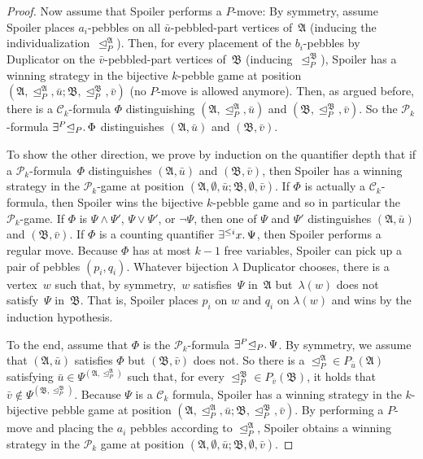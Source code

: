 \documentclass[]{lmcs}
\newcommand{\qspace}{\mathchoice{\;}{\,}{}{}}
\newcommand{\formA}{\Phi}
\newcommand{\formB}{\Psi}
\newcommand{\tup}[1]{\bar{#1}}
\newcommand{\vertA}{u}
\newcommand{\vertB}{v}
\newcommand{\vertC}{w}
\newcommand{\StructA}{\mathfrak{A}}
\newcommand{\StructB}{\mathfrak{B}}
\newcommand{\Ck}[1]{\mathcal{C}_{#1}}
\newcommand{\gamebij}{\lambda}
\newcommand{\indRel}{\trianglelefteq}
\newcommand{\Pk}[1]{\mathcal{P}_{#1}}
\newcommand{\existsP}[1]{\exists^P{#1}}
\newcommand{\partind}[2]{P_{#2}(#1)}
\begin{document}
\begin{proof}
	Now assume that Spoiler performs a $P$-move:
	By symmetry, assume Spoiler places $a_i$\nobreakdash-pebbles on all $\tup{\vertA}$\nobreakdash-pebbled-part vertices of~$\StructA$ (inducing the individualization~$\indRel_P^\StructA$).
	Then, for every placement of the $b_i$\nobreakdash-pebbles by Duplicator on the $\tup{\vertB}$\nobreakdash-pebbled-part vertices of~$\StructB$
	(inducing~$\indRel_P^\StructB$),
	Spoiler has a winning strategy in the bijective $k$-pebble game at position
	$(\StructA, \indRel_P^\StructA, \tup{\vertA}; \StructB, \indRel_P^\StructB, \tup{\vertB})$ (no $P$-move is allowed anymore).
	Then, as argued before, there is a $\Ck{k}$\nobreakdash-formula $\formA$
	distinguishing $(\StructA, \indRel_P^\StructA, \tup{\vertA})$ and $(\StructB, \indRel_P^\StructB, \tup{\vertB})$.
	So the $\Pk{k}$-formula
	$\existsP{\indRel_P}.\qspace \formA$
	distinguishes $(\StructA, \tup{\vertA})$ and $(\StructB, \tup{\vertB})$.
	
	To show the other direction,
	we prove by induction on the quantifier depth that if
	a $\Pk{k}$\nobreakdash-formula~$\formA$ distinguishes $(\StructA, \tup{\vertA})$ and $(\StructB, \tup{\vertB})$,
	then Spoiler has a winning strategy in the $\Pk{k}$-game at position $(\StructA, \emptyset,\tup{\vertA}; \StructB, \emptyset, \tup{\vertB})$.
	If $\formA$ is actually a $\Ck{k}$-formula, then Spoiler wins the bijective $k$-pebble game and so in particular the $\Pk{k}$-game.
	If $\formA$ is $\formB \land \formB'$, $\formB \lor \formB'$, or $\neg \formB$, then one of $\formB$ and $\formB'$ distinguishes $(\StructA, \tup{\vertA})$ and $(\StructB, \tup{\vertB})$.
	If $\formA$ is a counting quantifier $\exists^{\leq i} x.\qspace \formB$,
	then Spoiler performs a regular move.
	Because $\formA$ has at most $k-1$ free variables, Spoiler can pick up a pair of pebbles $(p_i,q_i)$.
	Whatever bijection $\gamebij$ Duplicator chooses,
	there is a vertex~$\vertC$ such that, by symmetry,~$\vertC$ satisfies~$\formB$ 
	in~$\StructA$ but~$\gamebij(\vertC)$ does not satisfy~$\formB$ in~$\StructB$.
	That is,
	Spoiler places $p_i$ on $\vertC$ and $q_i$ on $\gamebij(\vertC)$
	and wins by the induction hypothesis.
	
	To the end, assume that $\formA$ is the $\Pk{k}$-formula $\existsP{\indRel_P}.\qspace\formB$.
	By symmetry, we assume that $(\StructA, \tup{\vertA})$ satisfies $\formA$
	but $(\StructB, \tup{\vertB})$ does not.
	So there is a ${\indRel_P^\StructA} \in \partind{\StructA}{\tup{\vertA}}$
	satisfying $\tup{\vertA} \in \formB^{(\StructA, \indRel_P^\StructA)}$
	such that, for every ${\indRel_P^\StructB} \in \partind{\StructB}{\tup{\vertB}}$,
	it holds that  $\tup{\vertB} \notin \formB^{(\StructB, \indRel_P^\StructB)}$.
	Because $\formB$ is a $\Ck{k}$ formula,
	Spoiler has a winning strategy in the $k$-bijective pebble game at position 
	$(\StructA, \indRel_P^\StructA, \tup{\vertA}; \StructB, \indRel_P^\StructB, \tup{\vertB})$.
	By performing a $P$-move and placing the $a_i$ pebbles according to $\indRel_P^\StructA$,
	Spoiler obtains a winning strategy in the $\Pk{k}$ game at position
	$(\StructA, \emptyset, \tup{\vertA}; \StructB, \emptyset, \tup{\vertB})$.
\end{proof}
\end{document}
